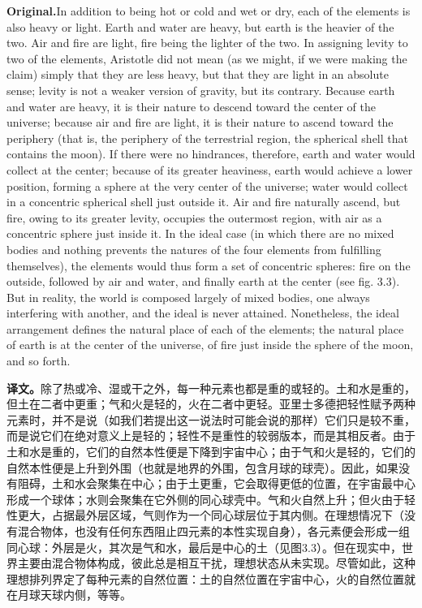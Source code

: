 \documentclass[UTF8]{ctexart}
\newcommand{\orig}{\par\noindent\textbf{Original.}\quad}
\newcommand{\zh}{\par\noindent\textbf{译文。}\quad}
\begin{document}
\orig In addition to being hot or cold and wet or dry, each of the elements is also heavy or light. Earth and water are heavy, but earth is the heavier of the two. Air and fire are light, fire being the lighter of the two. In assigning levity to two of the elements, Aristotle did not mean (as we might, if we were making the claim) simply that they are less heavy, but that they are light in an absolute sense; levity is not a weaker version of gravity, but its contrary. Because earth and water are heavy, it is their nature to descend toward the center of the universe; because air and fire are light, it is their nature to ascend toward the periphery (that is, the periphery of the terrestrial region, the spherical shell that contains the moon). If there were no hindrances, therefore, earth and water would collect at the center; because of its greater heaviness, earth would achieve a lower position, forming a sphere at the very center of the universe; water would collect in a concentric spherical shell just outside it. Air and fire naturally ascend, but fire, owing to its greater levity, occupies the outermost region, with air as a concentric sphere just inside it. In the ideal case (in which there are no mixed bodies and nothing prevents the natures of the four elements from fulfilling themselves), the elements would thus form a set of concentric spheres: fire on the outside, followed by air and water, and finally earth at the center (see fig. 3.3). But in reality, the world is composed largely of mixed bodies, one always interfering with another, and the ideal is never attained. Nonetheless, the ideal arrangement defines the natural place of each of the elements; the natural place of earth is at the center of the universe, of fire just inside the sphere of the moon, and so forth.

\zh 除了热或冷、湿或干之外，每一种元素也都是重的或轻的。土和水是重的，但土在二者中更重；气和火是轻的，火在二者中更轻。亚里士多德把轻性赋予两种元素时，并不是说（如我们若提出这一说法时可能会说的那样）它们只是较不重，而是说它们在绝对意义上是轻的；轻性不是重性的较弱版本，而是其相反者。由于土和水是重的，它们的自然本性便是下降到宇宙中心；由于气和火是轻的，它们的自然本性便是上升到外围（也就是地界的外围，包含月球的球壳）。因此，如果没有阻碍，土和水会聚集在中心；由于土更重，它会取得更低的位置，在宇宙最中心形成一个球体；水则会聚集在它外侧的同心球壳中。气和火自然上升；但火由于轻性更大，占据最外层区域，气则作为一个同心球层位于其内侧。在理想情况下（没有混合物体，也没有任何东西阻止四元素的本性实现自身），各元素便会形成一组同心球：外层是火，其次是气和水，最后是中心的土（见图3.3）。但在现实中，世界主要由混合物体构成，彼此总是相互干扰，理想状态从未实现。尽管如此，这种理想排列界定了每种元素的自然位置：土的自然位置在宇宙中心，火的自然位置就在月球天球内侧，等等。
\end{document}
